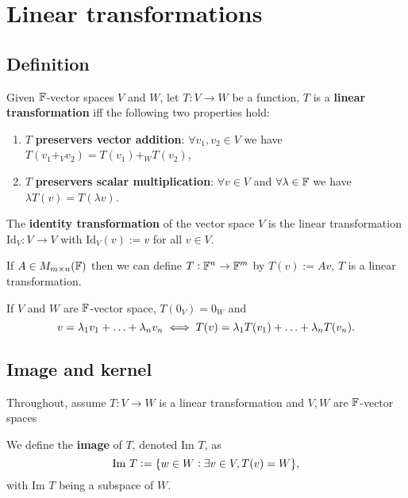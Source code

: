 \section{Linear transformations}

\subsection{Definition}

\begin{definition}
    Given $\mathbb{F}$-vector spaces $V$ and $W$, let $T:V \rightarrow W$ be a function, $T$ is a \textbf{linear transformation} iff the following two properties hold: \begin{enumerate}
        \item $T$ \textbf{preservers vector addition}: $\forall v_1,v_2\in V$ we have $T(v_1 +_V v_2) = T(v_1) +_W T(v_2)$,
        \item $T$ \textbf{preservers scalar multiplication}: $\forall v\in V$ and  $\forall \lambda \in \mathbb{F}$ we have $\lambda T(v) = T(\lambda v)$.
    \end{enumerate} 
\end{definition}

\begin{definition}
    The \textbf{identity transformation} of the vector space $V$ is the linear transformation $\text{Id}_V: V\rightarrow V$ with $\text{Id}_V(v):=v$ for all $v\in V$.
\end{definition}

\begin{definition}
    If $A\in M_{m\times n}(\mathbb{F})$ then we can define $T:\mathbb{F}^n \rightarrow \mathbb{F}^m$ by $T(v):=Av$, $T$ is a linear transformation.
\end{definition}

\begin{theorem}
    If $V$ and $W$ are $\mathbb{F}$-vector space, $T(0_V) = 0_W$ and \[
        v = \lambda_1v_1 + \ldots + \lambda_nv_n \iff T(v) = \lambda_1T(v_1) + \ldots + \lambda_nT(v_n)
        \textcolor{black}{.}
    \]
\end{theorem}

\subsection{Image and kernel}
Throughout, assume $T:V\rightarrow W$ is a linear transformation and $V,W$ are $\mathbb{F}$-vector spaces
\begin{definition}[Image]
    We define the \textbf{image} of $T$, denoted $\text{Im }T$, as \[
        \text{Im }T := \{w\in W: \exists v\in V, T(v)=W\}
        \textcolor{black}{,}
    \]
    with $\text{Im }T$ being a subspace of $W$.
\end{definition}


